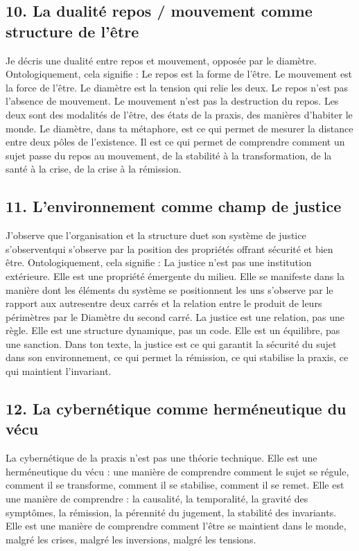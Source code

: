 \documentclass[12pt,letterpaper,oneside]{article}
\begin{document}
\subsection*{10. La dualité repos / mouvement comme structure de l’être}
Je décris une dualité entre repos et mouvement, opposée par le diamètre. Ontologiquement, cela signifie :
	Le repos est la forme de l’être.
	Le mouvement est la force de l’être.
	Le diamètre est la tension qui relie les deux.
Le repos n’est pas l’absence de mouvement. Le mouvement n’est pas la destruction du repos. Les deux sont des modalités de l’être, des états de la praxis, des manières d’habiter le monde.
Le diamètre, dans ta métaphore, est ce qui permet de mesurer la distance entre deux pôles de l’existence. Il est ce qui permet de comprendre comment un sujet passe du repos au mouvement, de la stabilité à la transformation, de la santé à la crise, de la crise à la rémission.

\subsection*{11. L’environnement comme champ de justice}
J’observe que l’organisation et la structure duet son système de justice s’observentqui s’observe par la position des propriétés offrant sécurité et bien  être. Ontologiquement, cela signifie :
	La justice n’est pas une institution extérieure.
	Elle est une propriété émergente du milieu.
	Elle se manifeste dans la manière dont les éléments du système se positionnent les uns s’observe par le rapport aux autresentre deux carrés et la relation entre le produit de leurs périmètres par le Diamètre du second carré.
La justice est une relation, pas une règle. Elle est une structure dynamique, pas un code. Elle est un équilibre, pas une sanction.
Dans ton texte, la justice est ce qui garantit la sécurité du sujet dans son environnement, ce qui permet la rémission, ce qui stabilise la praxis, ce qui maintient l’invariant.

\subsection*{12. La cybernétique comme herméneutique du vécu}
La cybernétique de la praxis n’est pas une théorie technique. Elle est une herméneutique du vécu : une manière de comprendre comment le sujet se régule, comment il se transforme, comment il se stabilise, comment il se remet.
Elle est une manière de comprendre :
	la causalité,
	la temporalité,
	la gravité des symptômes,
	la rémission,
	la pérennité du jugement,
	la stabilité des invariants.
Elle est une manière de comprendre comment l’être se maintient dans le monde, malgré les crises, malgré les inversions, malgré les tensions.
\end{document}
